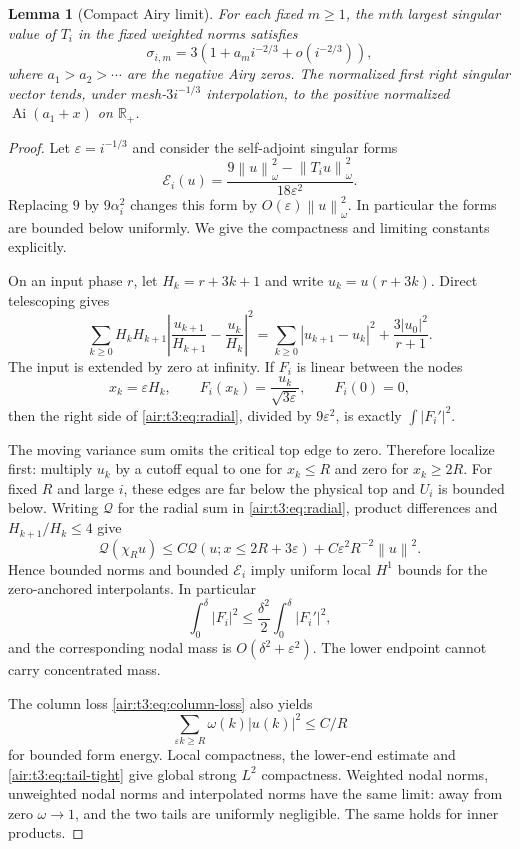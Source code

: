 \documentclass[11pt,letterpaper]{article}
\numberwithin{equation}{section}
\newtheorem{lemma}[theorem]{Lemma}
\theoremstyle{remark}
\newcommand{\Ai}{\operatorname{Ai}}
\newcommand{\norm}[1]{\left\lVert#1\right\rVert}
\newcommand{\R}{\mathbb{R}}
\newcommand{\eps}{\varepsilon}
\begin{document}
\begin{lemma}[Compact Airy limit]\label{air:t3:lem:singular}
For each fixed $m\ge1$, the $m$th largest singular value of $T_i$ in the fixed weighted norms satisfies
\[
\sigma_{i,m}=3\left(1+a_m i^{-2/3}+o(i^{-2/3})\right),
\]
where $a_1>a_2>\cdots$ are the negative Airy zeros. The normalized first right singular vector tends, under mesh-$3i^{-1/3}$ interpolation, to the positive normalized $\Ai(a_1+x)$ on $\R_+$.
\end{lemma}
\begin{proof}
Let $\eps=i^{-1/3}$ and consider the self-adjoint singular forms
\[
\mathcal E_i(u)=\frac{9\norm{u}_\omega^2-\norm{T_i u}_\omega^2}{18\eps^2}.
\]
Replacing $9$ by $9\alpha_i^2$ changes this form by $O(\eps)\norm{u}_\omega^2$. In particular the forms are bounded below uniformly. We give the compactness and limiting constants explicitly.

On an input phase $r$, let $H_k=r+3k+1$ and write $u_k=u(r+3k)$. Direct telescoping gives
\begin{equation}\label{air:t3:eq:radial}
\sum_{k\ge0}H_kH_{k+1}
\left|\frac{u_{k+1}}{H_{k+1}}-\frac{u_k}{H_k}\right|^2
=\sum_{k\ge0}|u_{k+1}-u_k|^2+\frac{3|u_0|^2}{r+1}.
\end{equation}
The input is extended by zero at infinity. If $F_i$ is linear between the nodes
\[
x_k=\eps H_k,\qquad F_i(x_k)=\frac{u_k}{\sqrt{3\eps}},
\qquad F_i(0)=0,
\]
then the right side of \eqref{air:t3:eq:radial}, divided by $9\eps^2$, is exactly $\int|F_i'|^2$.

The moving variance sum omits the critical top edge to zero. Therefore localize first: multiply $u_k$ by a cutoff equal to one for $x_k\le R$ and zero for $x_k\ge2R$. For fixed $R$ and large $i$, these edges are far below the physical top and $U_i$ is bounded below. Writing $\mathcal Q$ for the radial sum in \eqref{air:t3:eq:radial}, product differences and $H_{k+1}/H_k\le4$ give
\[
\mathcal Q(\chi_Ru)\le C\mathcal Q(u; x\le2R+3\eps)
+C\eps^2R^{-2}\norm{u}^2.
\] Hence bounded norms and bounded $\mathcal E_i$ imply uniform local $H^1$ bounds for the zero-anchored interpolants. In particular
\[
\int_0^\delta|F_i|^2\le\frac{\delta^2}{2}\int_0^\delta|F_i'|^2,
\]
and the corresponding nodal mass is $O(\delta^2+\eps^2)$. The lower endpoint cannot carry concentrated mass.

The column loss \eqref{air:t3:eq:column-loss} also yields
\begin{equation}\label{air:t3:eq:tail-tight}
\sum_{\eps k\ge R}\omega(k)|u(k)|^2\le C/R
\end{equation}
for bounded form energy. Local compactness, the lower-end estimate and \eqref{air:t3:eq:tail-tight} give global strong $L^2$ compactness. Weighted nodal norms, unweighted nodal norms and interpolated norms have the same limit: away from zero $\omega\to1$, and the two tails are uniformly negligible. The same holds for inner products.


\end{proof}
\end{document}
